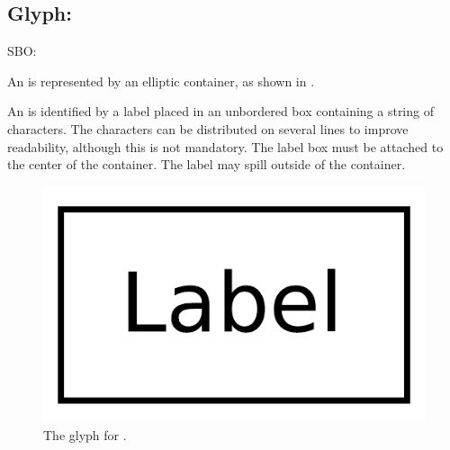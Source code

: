 \subsection{Glyph: }
\label{af:sec:biologicalActivity}


\begin{glyphDescription}

\glyphSboTerm SBO:

\glyphContainer An  is represented by an elliptic container, as shown in .

\glyphLabel An  is identified by a label placed in an unbordered box containing a string of characters.  The characters can be distributed on several lines to improve readability, although this is not mandatory.  The label box must be attached to the center of the container.  The label may spill outside of the container.

\end{glyphDescription}

\begin{figure}[H]
  \centering
  \includegraphics[scale = 0.3]{images/biologicalActivity}
  \caption{The \AF glyph for .}
  \label{fig:af:biologicalActivity}
\end{figure}
